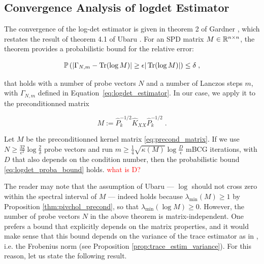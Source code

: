 \documentclass{article}
\begin{document}
{\subsection{Convergence Analysis of logdet Estimator} \label{sec:convergence_logdet}

The convergence of the log-det estimator is given in theorem 2 of Gardner \cite{gardner_gpytorch_2021}, which restates the result of theorem 4.1 of Ubaru \cite{ubaru_fast_2017}. For an SPD matrix $M \in \mathbb R^{n\times n}$, the theorem provides a probabilistic bound for the relative error:

\begin{equation} \label{eq:logdet_proba_bound}
    \mathbb P \left( \left| \Gamma_{N, m} - \operatorname{Tr}(\log M) \right| \ge \epsilon | \operatorname{Tr}(\log M) | \right) \le \delta \; ,
\end{equation}

that holds with a number of probe vectors $N$ and a number of Lanczos steps $m$, with $\Gamma_{N, m}$ defined in Equation~\eqref{eq:logdet_estimator}. In our case, we apply it to the preconditionned matrix

\begin{equation} \label{eq:precond_matrix}
    M := \widehat P^{-1/2}_k \widehat K_{XX} \widehat P^{-1/2}_k \; .
\end{equation}

\begin{theorem} \label{thm:gardner_logdet}
Let $M$ be the preconditionned kernel matrix \eqref{eq:precond_matrix}. If we use $N \ge \frac{32}{\epsilon^2} \log \frac{2}{\delta}$ probe vectors and run $m \ge \frac{1}{4} \sqrt{\kappa(M)} \log \frac{D}{\epsilon}$ mBCG iterations, with $D$ that also depends on the condition number, then the probabilistic bound \eqref{eq:logdet_proba_bound} holds. \textcolor{red}{what is D?} 
\end{theorem}

The reader may note that the assumption of Ubaru --- $\log$ should not cross zero within the spectral interval of $M$ --- indeed holds because $\lambda_{\min}(M) \ge 1$ by Proposition \ref{thm:pivchol_precond}, so that $\lambda_{\min}(\log M) \ge 0$. However, the number of probe vectors $N$ in the above theorem is matrix-independent. One prefers a bound that explicitly depends on the matrix properties, and it would make sense that this bound depends on the variance of the trace estimator as in \cite{cortinovis_randomized_2021}, i.e. the Frobenius norm (see Proposition \ref{prop:trace_estim_variance}). For this reason, let us state the following result.


}
\end{document}
